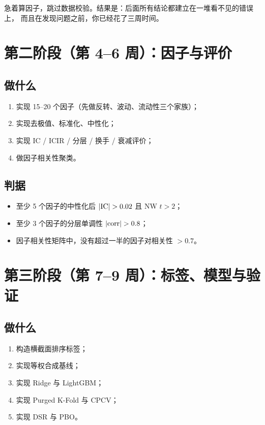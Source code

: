 \begin{warnbox}[最常见的失败模式]
急着算因子，跳过数据校验。结果是：后面所有结论都建立在一堆看不见的错误上，
而且在发现问题之前，你已经花了三周时间。
\end{warnbox}

\section{第二阶段（第 4--6 周）：因子与评价}

\subsection{做什么}

\begin{enumerate}
  \item 实现 15--20 个因子（先做反转、波动、流动性三个家族）；
  \item 实现去极值、标准化、中性化；
  \item 实现 IC / ICIR / 分层 / 换手 / 衰减评价；
  \item 做因子相关性聚类。
\end{enumerate}

\subsection{判据}

\begin{itemize}
  \item 至少 5 个因子的中性化后 $|{\rm IC}| > 0.02$ 且 NW $t > 2$；
  \item 至少 3 个因子的分层单调性 $|{\rm corr}| > 0.8$；
  \item 因子相关性矩阵中，没有超过一半的因子对相关性 $>0.7$。
\end{itemize}

\section{第三阶段（第 7--9 周）：标签、模型与验证}

\subsection{做什么}

\begin{enumerate}
  \item 构造横截面排序标签；
  \item 实现等权合成基线；
  \item 实现 Ridge 与 LightGBM；
  \item 实现 Purged K-Fold 与 CPCV；
  \item 实现 DSR 与 PBO。
\end{enumerate}

